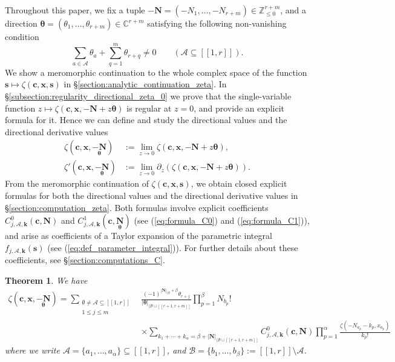 \documentclass[a4paper]{amsart}
\newtheorem{maintheorem}{Theorem}
\theoremstyle{remark}
\theoremstyle{definition}
\begin{document}
Throughout this paper, we fix a tuple $-\mathbf{N}=(-N_1,\ldots,-N_{r+m}) \in \mathbb{Z}_{\leq 0}^{r+m}$, and a direction $\bm{\theta}=(\theta_1,\ldots,\theta_{r+m}) \in \mathbb{C}^{r+m}$ satisfying the following non-vanishing condition
\begin{equation}
    \sum_{a \in \mathcal{A}}\theta_a + \sum_{q=1}^m \theta_{r+q} \neq 0 \qquad (\mathcal{A} \subseteq [\![ 1,r ]\!]).\label{eq:direction_non_vanishing_condition}
\end{equation}
We show a meromorphic continuation to the whole complex space of the function $\mathbf{s} \mapsto \zeta(\mathbf{c},\mathbf{x},\mathbf{s})$ in §\ref{section:analytic_continuation_zeta}. In §\ref{subsection:regularity_directional_zeta_0} we prove that the single-variable function $z \mapsto \zeta(\mathbf{c},\mathbf{x},-\mathbf{N}+z\bm{\theta})$ is regular at $z=0$, and provide an explicit formula for it. Hence we can define and study the directional values and the directional derivative values
\begin{align}
    \zeta(\mathbf{c},\mathbf{x},\underset{\bm{\theta}}{-\mathbf{N}}) &:= \lim_{z \to 0} \zeta(\mathbf{c},\mathbf{x},-\mathbf{N}+z\bm{\theta}), \label{eq:def_directional_value} \\
    \zeta'(\mathbf{c},\mathbf{x},\underset{\bm{\theta}}{-\mathbf{N}}) &:= \lim_{z \to 0} \partial_z (\zeta(\mathbf{c},\mathbf{x},-\mathbf{N}+z\bm{\theta})). \label{eq:def_directional_derivative_value}
\end{align}
From the meromorphic continuation of $\zeta(\mathbf{c},\mathbf{x},\mathbf{s})$, we obtain closed explicit formulas for both the directional values and the directional derivative values in §\ref{section:computation_zeta}. Both formulas involve explicit coefficients $C^0_{j,\mathcal{A},\mathbf{k}}(\mathbf{c},\mathbf{N})$ and $C^1_{j,\mathcal{A},\mathbf{k}}(\mathbf{c},\underset{\bm{\theta}}{\mathbf{N}})$ (see (\ref{eq:formula_C0}) and (\ref{eq:formula_C1})), and arise as coefficients of a Taylor expansion of the parametric integral $f_{j,\mathcal{A},\mathbf{k}}(\mathbf{s})$ (see (\ref{eq:def_parameter_integral})). For further details about these coefficients, see §\ref{section:computations_C}.
\begin{maintheorem}
\label{th:directional_values_mzf}
We have
\begin{align}
    \zeta( \mathbf{c},\mathbf{x},\underset{\bm{\theta}}{-\mathbf{N}}) = \sum_{\substack{\emptyset \neq \mathcal{A} \subseteq [\![1,r]\!] \\ 1 \leq j \leq m}}& \frac{(-1)^{|\mathbf{N}|_{|\mathcal{B}}+ \beta}\theta_{r+j}}{|\bm{\theta}|_{|\mathcal{B}\cup[\![r+1,r+m]\!]}} \prod_{p=1}^{\beta} N_{b_p}! \label{eq:zeta_N} \\
    & \times \sum_{k_1+\cdots+k_{\alpha} = \beta + |\mathbf{N}|_{|\mathcal{B}\cup [\![ r+1,r+m ]\!]}} C^0_{j,\mathcal{A},\mathbf{k}}(\mathbf{c},\mathbf{N}) \prod_{p=1}^{\alpha} \frac{\zeta(-N_{a_p}-k_p,x_{a_p})}{k_p!} \nonumber
\end{align}
where we write $\mathcal{A}=\{ a_1,\ldots,a_{\alpha} \} \subseteq [\![ 1,r ]\!]$, and $\mathcal{B}= \{ b_1,\ldots,b_{\beta} \}:=[\![1,r]\!] \setminus \mathcal{A}$.
\end{maintheorem}
\end{document}
